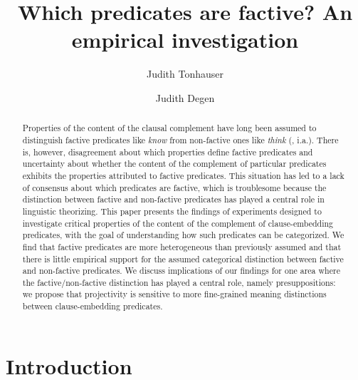 \documentclass[11pt,fleqn]{article}
\title{Which predicates are factive? An empirical investigation}
\author[$\circ$]{Judith Tonhauser}
\author[$\bullet$]{Judith Degen}
\affil[$\circ$]{The Ohio State University / University of Stuttgart}
\affil[$\bullet$]{Stanford University}
\newcommand{\6}{\mbox{$[\hspace*{-.6mm}[$}}
\newcommand{\9}{\mbox{$]\hspace*{-.6mm}]$}}
\begin{document}

\maketitle

\vspace*{-1cm}

\begin{abstract}

Properties of the content of the clausal complement have long been assumed to distinguish factive predicates like {\em know} from non-factive ones like {\em think} (\citealt{kiparsky-kiparsky70}, i.a.). There is, however, disagreement  about which properties define factive predicates and uncertainty about whether the content of the complement of particular predicates exhibits the properties attributed to factive predicates. This situation has led to a lack of consensus about which predicates are factive, which is troublesome because the distinction between factive and non-factive predicates has played a central role in linguistic theorizing. This paper presents the findings of experiments designed to investigate critical properties of the content of the complement of clause-embedding predicates, with the goal of understanding how such predicates can be categorized. We find that factive predicates are more heterogeneous than previously assumed and that there is little empirical support for the assumed categorical distinction between factive and non-factive predicates. We discuss implications of our findings for one area where the factive/non-factive distinction has played a central role, namely presuppositions: we propose that projectivity is sensitive to more fine-grained meaning distinctions between clause-embedding predicates.

\end{abstract}

			
\section{Introduction}\label{s1}
\end{document}

